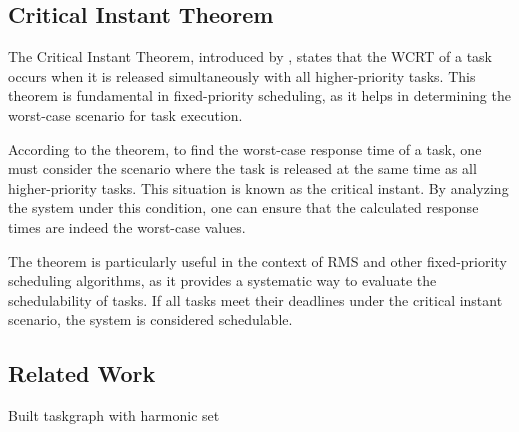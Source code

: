 \subsection{Critical Instant Theorem}\label{sec:critical_instant_theorem}
The Critical Instant Theorem, introduced by \textcite{liuSchedulingAlgorithmsMultiprogramming1973}, states that the \ac{WCRT} of a task occurs when it is released simultaneously with all higher-priority tasks.
This theorem is fundamental in fixed-priority scheduling, as it helps in determining the worst-case scenario for task execution.

According to the theorem, to find the worst-case response time of a task, one must consider the scenario where the task is released at the same time as all higher-priority tasks. 
This situation is known as the critical instant. By analyzing the system under this condition, one can ensure that the calculated response times are indeed the worst-case values.

The theorem is particularly useful in the context of \ac{RMS} and other fixed-priority scheduling algorithms, as it provides a systematic way to evaluate the schedulability of tasks. 
If all tasks meet their deadlines under the critical instant scenario, the system is considered schedulable.

\subsection{Related Work}
\label{sec:related_work}
\todo{}
\cite{dar-tzenpengAssignmentSchedulingCommunicating1997} Built taskgraph with harmonic set 
